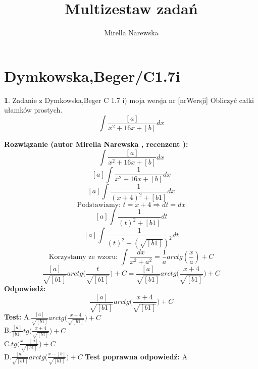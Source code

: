 \documentclass[12pt, a4paper]{article}
\title{Multizestaw zadań}
\author{Mirella Narewska}
\date{}
\theoremstyle{definition} %
\newtheorem{zad}{}
\newcommand{\kategoria}[1]{\section{#1}} %
\newcommand{\zadStart}[1]{\begin{zad}#1\newline} %
\newcommand{\zadStop}{\end{zad}}   %
\newcommand{\rozwStart}[2]{\noindent \textbf{Rozwiązanie (autor #1 , recenzent #2): }\newline} %
\newcommand{\rozwStop}{\newline}                                            %
\newcommand{\odpStart}{\noindent \textbf{Odpowiedź:}\newline}    %
\newcommand{\odpStop}{\newline}                                             %
\newcommand{\testStart}{\noindent \textbf{Test:}\newline} %
\newcommand{\testStop}{\newline} %
\newcommand{\kluczStart}{\noindent \textbf{Test poprawna odpowiedź:}\newline} %
\newcommand{\kluczStop}{\newline} %
\begin{document}
\maketitle


\kategoria{Dymkowska,Beger/C1.7i}
\zadStart{Zadanie z Dymkowska,Beger C 1.7 i) moja wersja nr [nrWersji]}
Obliczyć całki ułamków prostych.$$\int\frac{[a]}{x^{2}+16x+[b]}dx$$
\zadStop
\rozwStart{Mirella Narewska}{}
$$\int\frac{[a]}{x^{2}+16x+[b]}dx$$
$$[a]\int\frac{1}{x^{2}+16x+[b]}dx$$
$$[a]\int\frac{1}{(x+4)^{2}+[b1]}dx$$
$$\text{Podstawiamy: }t=x+4\Rightarrow dt=dx$$
$$[a]\int\frac{1}{(t)^{2}+[b1]}dt$$
$$[a]\int\frac{1}{(t)^{2}+(\sqrt{[b1]})^{2}}dt$$
$$\text{Korzystamy ze wzoru: }\int\frac{dx}{x^{2}+a^{2}}=\frac{1}{a}arctg(\frac{x}{a})+C$$
$$\frac{[a]}{\sqrt{[b1]}}arctg\bigg(\frac{t}{\sqrt{[b1]}}\bigg)+C=\frac{[a]}{\sqrt{[b1]}}arctg\bigg(\frac{x+4}{\sqrt{[b1]}}\bigg)+C$$
\rozwStop
\odpStart
$$\frac{[a]}{\sqrt{[b1]}}arctg\bigg(\frac{x+4}{\sqrt{[b1]}}\bigg)+C$$
\odpStop
\testStart
A.$\frac{[a]}{\sqrt{[b1]}}arctg\big(\frac{x+4}{\sqrt{[b1]}}\big)+C$
\\B.$\frac{[a]}{[b1]}tg\big(\frac{x+4}{\sqrt{[b1]}}\big)+C$
\\C.$tg\big(\frac{x-[a]}{\sqrt{[b1]}}\big)+C$
\\D.$\frac{[a]}{\sqrt{[b1]}}arctg\big(\frac{x-[b]}{\sqrt{[b1]}}\big)+C$
\testStop
\kluczStart
A
\kluczStop
\end{document}
